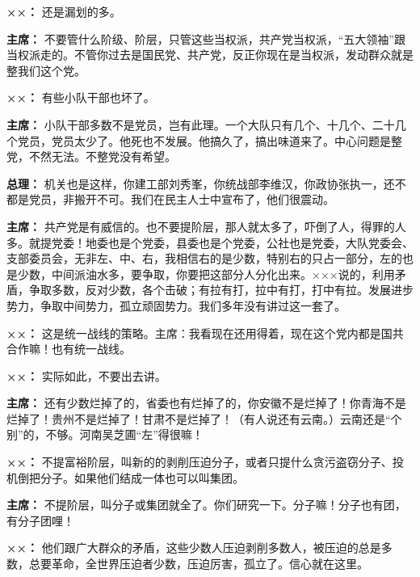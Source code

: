 \begin{duihua}
\item[\textbf{××：}] 还是漏划的多。

\item[\textbf{主席：}] 不要管什么阶级、阶层，只管这些当权派，共产党当权派，“五大领袖”跟当权派走的。不管你过去是国民党、共产党，反正你现在是当权派，发动群众就是整我们这个党。

\item[\textbf{××：}] 有些小队干部也坏了。

\item[\textbf{主席：}] 小队干部多数不是党员，岂有此理。一个大队只有几个、十几个、二十几个党员，党员太少了。他死也不发展。他搞久了，搞出味道来了。中心问题是整党，不然无法。不整党没有希望。

\item[\textbf{总理：}] 机关也是这样，你建工部刘秀峯，你统战部李维汉，你政协张执一，还不都是党员，非搬开不可。我们在民主人士中宣布了，他们很震动。

\item[\textbf{主席：}] 共产党是有威信的。也不要提阶层，那人就太多了，吓倒了人，得罪的人多。就提党委！地委也是个党委，县委也是个党委，公社也是党委，大队党委会、支部委员会，无非左、中、右，我相信右的是少数，特别右的只占一部分，左的也是少数，中间派油水多，要争取，你要把这部分人分化出来。×××说的，利用矛盾，争取多数，反对少数，各个击破；有拉有打，拉中有打，打中有拉。发展进步势力，争取中间势力，孤立顽固势力。我们多年没有讲过这一套了。

\item[\textbf{××：}] 这是统一战线的策略。主席：我看现在还用得着，现在这个党内都是国共合作嘛！也有统一战线。

\item[\textbf{××：}] 实际如此，不要出去讲。

\item[\textbf{主席：}] 还有少数烂掉了的，省委也有烂掉了的，你安徽不是烂掉了！你青海不是烂掉了！贵州不是烂掉了！甘肃不是烂掉了！（有人说还有云南。）云南还是“个别”的，不够。河南吴芝圃“左”得很嘛！

\item[\textbf{××：}] 不提富裕阶层，叫新的的剥削压迫分子，或者只提什么贪污盗窃分子、投机倒把分子。如果他们结成一体也可以叫集团。

\item[\textbf{主席：}] 不提阶层，叫分子或集团就全了。你们研究一下。分子嘛！分子也有团，有分子团哩！

\item[\textbf{××：}] 他们跟广大群众的矛盾，这些少数人压迫剥削多数人，被压迫的总是多数，总要革命，全世界压迫者少数，压迫厉害，孤立了。信心就在这里。


\end{duihua}
